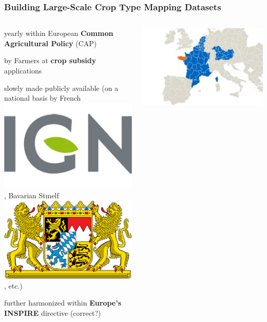 \begin{frame}
\frametitle{Building Large-Scale Crop Type Mapping Datasets}

\begin{columns}
	
	
	\Large
	
	\begin{description}\setlength\itemsep{1em}
		\item[\color{tumblue}collected] yearly within European \textbf{Common Agricultural Policy} (CAP)
		\item[\color{tumblue}declared] by Farmers at \textbf{crop subsidy} applications
		\item[\color{tumblue}today] slowly made publicly available (on a national basis by French \includegraphics[height=.9em]{images/IGN-logo}, Bavarian Stmelf \includegraphics[height=.9em]{images/stmelf-logo}, etc.)
		\item[\color{tumblue}in future] further harmonized within \textbf{Europe's INSPIRE} directive (correct?)
	\end{description}
	
	\includegraphics[width=\textwidth]{images/europe_data2}
	
	
	
	
\end{columns}

\vspace{2em}


\end{frame}


